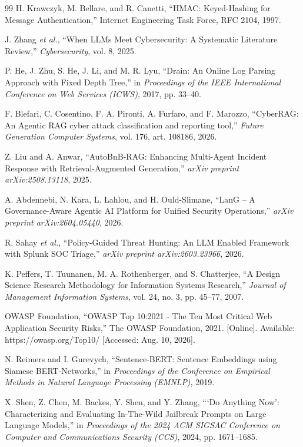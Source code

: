 \documentclass[12pt,a4paper]{report}
\begin{document}
\begin{thebibliography}{99}
H. Krawczyk, M. Bellare, and R. Canetti, ``HMAC: Keyed-Hashing for Message Authentication,'' Internet Engineering Task Force, RFC 2104, 1997.

J. Zhang \textit{et al.}, ``When LLMs Meet Cybersecurity: A Systematic Literature Review,'' \textit{Cybersecurity}, vol. 8, 2025.

P. He, J. Zhu, S. He, J. Li, and M. R. Lyu, ``Drain: An Online Log Parsing Approach with Fixed Depth Tree,'' in \textit{Proceedings of the IEEE International Conference on Web Services (ICWS)}, 2017, pp. 33--40.

F. Blefari, C. Cosentino, F. A. Pironti, A. Furfaro, and F. Marozzo, ``CyberRAG: An Agentic RAG cyber attack classification and reporting tool,'' \textit{Future Generation Computer Systems}, vol. 176, art. 108186, 2026.

Z. Liu and A. Anwar, ``AutoBnB-RAG: Enhancing Multi-Agent Incident Response with Retrieval-Augmented Generation,'' \textit{arXiv preprint arXiv:2508.13118}, 2025.

A. Abdennebi, N. Kara, L. Lahlou, and H. Ould-Slimane, ``LanG -- A Governance-Aware Agentic AI Platform for Unified Security Operations,'' \textit{arXiv preprint arXiv:2604.05440}, 2026.

R. Sahay \textit{et al.}, ``Policy-Guided Threat Hunting: An LLM Enabled Framework with Splunk SOC Triage,'' \textit{arXiv preprint arXiv:2603.23966}, 2026.

K. Peffers, T. Tuunanen, M. A. Rothenberger, and S. Chatterjee, ``A Design Science Research Methodology for Information Systems Research,'' \textit{Journal of Management Information Systems}, vol. 24, no. 3, pp. 45--77, 2007.

OWASP Foundation, ``OWASP Top 10:2021 - The Ten Most Critical Web Application Security Risks,'' The OWASP Foundation, 2021. [Online]. Available: https://owasp.org/Top10/ [Accessed: Aug. 10, 2026].

N. Reimers and I. Gurevych, ``Sentence-BERT: Sentence Embeddings using Siamese BERT-Networks,'' in \textit{Proceedings of the Conference on Empirical Methods in Natural Language Processing (EMNLP)}, 2019.

X. Shen, Z. Chen, M. Backes, Y. Shen, and Y. Zhang, ```Do Anything Now': Characterizing and Evaluating In-The-Wild Jailbreak Prompts on Large Language Models,'' in \textit{Proceedings of the 2024 ACM SIGSAC Conference on Computer and Communications Security (CCS)}, 2024, pp. 1671--1685.


\end{thebibliography}
\end{document}
